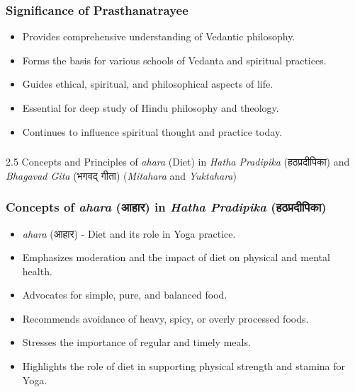 \begin{frame}[fragile]\frametitle{Significance of Prasthanatrayee}

      \begin{itemize}
		\item Provides comprehensive understanding of Vedantic philosophy.
		\item Forms the basis for various schools of Vedanta and spiritual practices.
		\item Guides ethical, spiritual, and philosophical aspects of life.
		\item Essential for deep study of Hindu philosophy and theology.
		\item Continues to influence spiritual thought and practice today.
	  \end{itemize}

\end{frame}


\begin{frame}[fragile]\frametitle{}
\begin{center}
{\Large 2.5 Concepts and Principles of \textit{ahara} (Diet) in \textit{Hatha Pradipika} (हठप्रदीपिका) and \textit{Bhagavad Gita} (भगवद् गीता) (\textit{Mitahara} and \textit{Yuktahara})}
\end{center}
\end{frame}

\begin{frame}[fragile]\frametitle{Concepts of \textit{ahara} (आहार) in \textit{Hatha Pradipika} (हठप्रदीपिका)}

      \begin{itemize}
		\item \textit{ahara} (आहार) - Diet and its role in Yoga practice.
		\item Emphasizes moderation and the impact of diet on physical and mental health.
		\item Advocates for simple, pure, and balanced food.
		\item Recommends avoidance of heavy, spicy, or overly processed foods.
		\item Stresses the importance of regular and timely meals.
		\item Highlights the role of diet in supporting physical strength and stamina for Yoga.
	  \end{itemize}

\end{frame}

